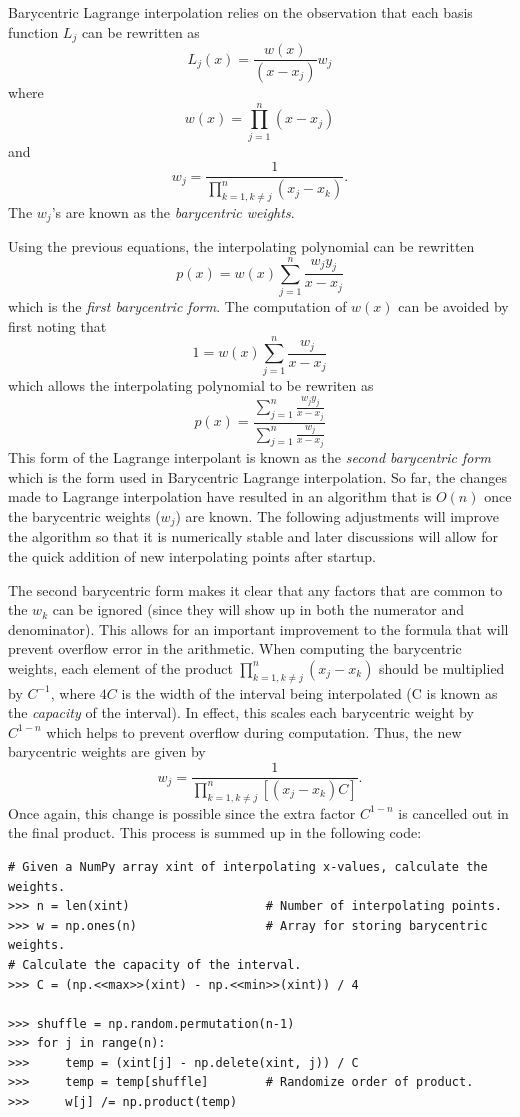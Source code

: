 Barycentric Lagrange interpolation relies on the observation that each basis function $L_j$ can be rewritten as
\[
L_j(x) = \frac{w(x)}{(x-x_j)}w_j
\]
where
\[
w(x) = \prod_{j=1}^n (x-x_j)
\]
and
\[
w_j = \frac{1}{\prod_{k=1, k \neq j}^n (x_j-x_k)}.
\]
The $w_j$'s are known as the \emph{barycentric weights}.

Using the previous equations, the interpolating polynomial can be rewritten
\[
p(x) = w(x) \sum_{j=1}^n \frac{w_j y_j}{x-x_j}
\]
which is the \emph{first barycentric form}.
The computation of $w(x)$ can be avoided by first noting that
\[
1 = w(x) \sum_{j=1}^n \frac{w_j}{x-x_j}
\]
which allows the interpolating polynomial to be rewriten as
\[
p(x) = \frac{\displaystyle\sum_{j=1}^n \frac{w_j y_j}{x-x_j}}{\displaystyle\sum_{j=1}^n \frac{w_j}{x-x_j}}
\]
This form of the Lagrange interpolant is known as the \emph{second barycentric form} which is the form used in Barycentric Lagrange interpolation.
So far, the changes made to Lagrange interpolation have resulted in an algorithm that is $O(n)$ once the barycentric weights ($w_j$) are known.
The following adjustments will improve the algorithm so that it is numerically stable and later discussions will allow for the quick addition of new interpolating points after startup.

The second barycentric form makes it clear that any factors that are common to the $w_k$ can be ignored (since they will show up in both the numerator and denominator).
This allows for an important improvement to the formula that will prevent overflow error in the arithmetic.
When computing the barycentric weights, each element of the product $\prod_{k=1, k \neq j}^n (x_j-x_k)$ should be multiplied by $C^{-1}$, where $4C$ is the width of the interval being interpolated
(C is known as the \emph{capacity} of the interval).
In effect, this scales each barycentric weight by $C^{1-n}$ which helps to prevent overflow during computation.
Thus, the new barycentric weights are given by
\[
w_j = \frac{1}{\prod_{k=1, k \neq j}^n \left[(x_j-x_k)C\right]}.
\]
Once again, this change is possible since the extra factor $C^{1-n}$ is cancelled out in the final product.
This process is summed up in the following code:

\begin{lstlisting}
# Given a NumPy array xint of interpolating x-values, calculate the weights.
>>> n = len(xint)                   # Number of interpolating points.
>>> w = np.ones(n)                  # Array for storing barycentric weights.
# Calculate the capacity of the interval.
>>> C = (np.<<max>>(xint) - np.<<min>>(xint)) / 4

>>> shuffle = np.random.permutation(n-1)
>>> for j in range(n):
>>>     temp = (xint[j] - np.delete(xint, j)) / C
>>>     temp = temp[shuffle]        # Randomize order of product.
>>>     w[j] /= np.product(temp)
\end{lstlisting}

